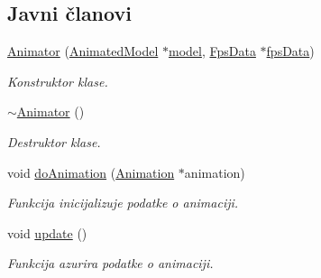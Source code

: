 \subsection*{Javni članovi}
\begin{DoxyCompactItemize}
\item 
\hyperlink{classanimation_1_1Animator_ab8f3fac8a3500bf117e3a68c6cf58b62}{Animator} (\hyperlink{classmodel_1_1AnimatedModel}{Animated\+Model} $\ast$\hyperlink{classanimation_1_1Animator_a5578ef87b7bf69b4434dcf916c279714}{model}, \hyperlink{classutility_1_1FpsData}{Fps\+Data} $\ast$\hyperlink{classanimation_1_1Animator_a865e52c4c069f203f847fbd98b86c52a}{fps\+Data})
\begin{DoxyCompactList}\small\item\em Konstruktor klase. \end{DoxyCompactList}\item 
\hyperlink{classanimation_1_1Animator_aa41360723d4542becc20a238f25bed4a}{$\sim$\+Animator} ()
\begin{DoxyCompactList}\small\item\em Destruktor klase. \end{DoxyCompactList}\item 
void \hyperlink{classanimation_1_1Animator_a770c61c392ecf21df366a5cf69f4318e}{do\+Animation} (\hyperlink{classanimation_1_1Animation}{Animation} $\ast$animation)
\begin{DoxyCompactList}\small\item\em Funkcija inicijalizuje podatke o animaciji. \end{DoxyCompactList}\item 
void \hyperlink{classanimation_1_1Animator_a65c3fb2eca8bb0a882d36a452b170c9e}{update} ()
\begin{DoxyCompactList}\small\item\em Funkcija azurira podatke o animaciji. \end{DoxyCompactList}\end{DoxyCompactItemize}
